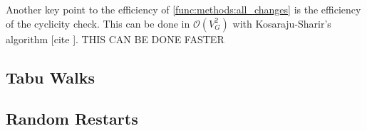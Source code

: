 \documentclass[sigconf, fleqn, prologue, dvipsnames]{acmart}
\def\O{\mathcal{O}}
\def\ndy{%
    \reversemarginpar%
    \marginpar{\raggedleft\textcolor{red}{\rule{2mm}{2mm}}}%
}
\begin{document}
Another key point to the efficiency of \autoref{func:methods:all_changes} is the efficiency of the cyclicity check.
This can be done in $\O(V_G^2)$ with Kosaraju-Sharir's algorithm [cite\ndy].
THIS CAN BE DONE FASTER\ndy

\FloatBarrier


\subsection{Tabu Walks}
\ndy


\subsection{Random Restarts}
\ndy
\end{document}
